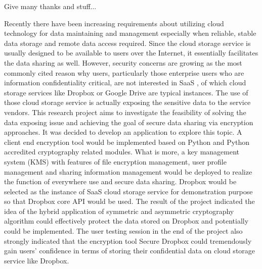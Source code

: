 \documentclass[a4paper, 12pt, oneside]{report}         %
\begin{document}

\thesistitlepage                                  %

\thesisdeclarationpage    			  %

\thesispermissionpage				  %


\begin{thesisacknowledgments}                     %
Give many thanks and stuff...

\end{thesisacknowledgments}                       %

\begin{thesisabstract}

Recently there have been increasing requirements about utilizing cloud technology for data maintaining and management especially when reliable, stable data storage and remote data access required. Since the cloud storage service is usually designed to be available to users over the Internet, it essentially facilitates the data sharing as well. However, security concerns are growing as the most commonly cited reason why users, particularly those enterprise users who are information confidentiality critical, are not interested in SaaS \cite{kamara2010cryptographic}, of which cloud storage services like Dropbox or Google Drive are typical instances. The use of those cloud storage service is actually exposing the sensitive data to the service vendors.
This research project aims to investigate the feasibility of solving the data exposing issue and achieving the goal of secure data sharing via encryption approaches. It was decided to develop an application to explore this topic. A client end encryption tool would be implemented based on Python and Python accredited cryptography related modules. What is more, a key management system (KMS) with features of file encryption management, user profile management and sharing information management would be deployed to realize the function of everywhere use and secure data sharing. Dropbox would be selected as the instance of SaaS cloud storage service for demonstration purpose so that Dropbox core API would be used.
The result of the project indicated the idea of the hybrid application of symmetric and asymmetric cryptography algorithm could effectively protect the data stored on Dropbox and potentially could be implemented. The user testing session in the end of the project also strongly indicated that the encryption tool Secure Dropbox could tremendously gain users’ confidence in terms of storing their confidential data on cloud storage service like Dropbox.

\end{thesisabstract}
\end{document}
